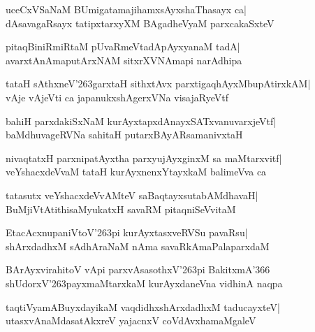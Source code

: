 \documentclass[twoside,12pt,openright]{book}
\def\S{\char'263}
\newcounter{shloka}[chapter]
\begin{document}
\begin{shloka}%
uceCxVSaNaM BUmigatamajihamxsAyxshaThasayx ca|\\
dAsavagaRsayx tatipxtarxyXM BAgadheVyaM parxcakaSxteV
\end{shloka}

\begin{shloka}%
pitaqBiniRmiRtaM pUvaRmeVtadApAyxyanaM tadA|\\
avarxtAnAmaputArxNAM sitxrXVNAmapi narAdhipa
\end{shloka}

\begin{shloka}%
tataH sAthxneV\S garxtaH sithxtAvx parxtigaqhAyxMbupAtirxkAM|\\
vAje vAjeVti ca japanukxshAgerxVNa visajaRyeVtf
\end{shloka}

\begin{shloka}%
bahiH parxdakiSxNaM kurAyxtapxdAnayxSATxvanuvarxjeVtf|\\
baMdhuvageRVNa sahitaH putarxBAyARsamanivxtaH
\end{shloka}

\begin{shloka}%
nivaqtatxH parxnipatAyxtha parxyujAyxginxM sa maMtarxvitf|\\
veYshacxdeVvaM tataH kurAyxnenxYtayxkaM balimeVva ca
\end{shloka}

\begin{shloka}%
tatasutx veYshacxdeVvAMteV saBaqtayxsutabAMdhavaH|\\
BuMjiVtAtithisaMyukatxH savaRM pitaqniSeVvitaM
\end{shloka}

\begin{shloka}%
EtacAcxnupaniVtoV\S pi kurAyxtasxveRVSu pavaRsu|\\
shArxdadhxM sAdhAraNaM nAma savaRkAmaPalaparxdaM
\end{shloka}

\begin{shloka}%
BArAyxvirahitoV vApi parxvAsasothxV\S pi BakitxmA\char'366\\
shUdorxV\S payxmaMtarxkaM kurAyxdaneVna vidhinA naqpa
\end{shloka}

\begin{shloka}%
taqtiVyamABuyxdayikaM vaqdidhxshArxdadhxM taducayxteV|\\
utasxvAnaMdasatAkxreV yajacnxV coVdAvxhamaMgaleV
\end{shloka}
\end{document}
